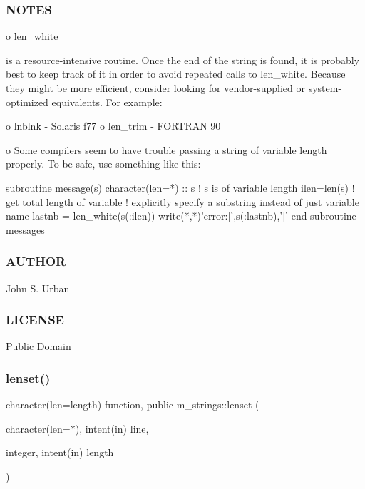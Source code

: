 \subsubsection*{N\+O\+T\+ES}

o len\+\_\+white \begin{DoxyVerb} is a resource-intensive routine. Once the end of
 the string is found, it is probably best to keep track of it in
 order to avoid repeated calls to len_white. Because they
 might be more efficient, consider looking for vendor-supplied or
 system-optimized equivalents. For example:

    o lnblnk - Solaris f77
    o len_trim - FORTRAN 90
\end{DoxyVerb}


o Some compilers seem to have trouble passing a string of variable length properly. To be safe, use something like this\+: \begin{DoxyVerb}subroutine message(s)
 character(len=*) :: s ! s is of variable length
    ilen=len(s)        ! get total length of variable
    ! explicitly specify a substring instead of just variable name
    lastnb = len_white(s(:ilen))
    write(*,*)'error:[',s(:lastnb),']'
end subroutine messages
\end{DoxyVerb}


\subsubsection*{A\+U\+T\+H\+OR}

John S. Urban \subsubsection*{L\+I\+C\+E\+N\+SE}

Public Domain \mbox{\label{namespacem__strings_a378563bb49f128bf0cf9c9d2b1f34498}} 
\subsubsection{\texorpdfstring{lenset()}{lenset()}}
{\footnotesize\ttfamily character(len=length) function, public m\+\_\+strings\+::lenset (\begin{DoxyParamCaption}\item[{character(len=$\ast$), intent(in)}]{line,  }\item[{integer, intent(in)}]{length }\end{DoxyParamCaption})}



